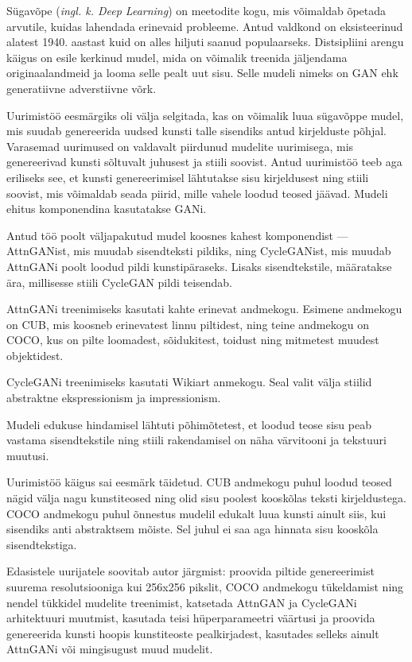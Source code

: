 \documentclass{vilgym}
\newcommand*{\inglk}[1]{(\textit{ingl. k. #1})}
\begin{document}
	
	Sügavõpe \inglk{Deep Learning} on meetodite kogu, mis võimaldab õpetada arvutile, kuidas lahendada erinevaid probleeme. Antud valdkond on eksisteerinud alatest 1940. aastast kuid on alles hiljuti saanud populaarseks. Distsipliini arengu käigus on esile kerkinud mudel, mida on võimalik treenida jäljendama originaalandmeid ja looma selle pealt uut sisu. Selle mudeli nimeks on GAN ehk generatiivne adverstiivne võrk.
	
	Uurimistöö eesmärgiks oli välja selgitada, kas on võimalik luua sügavõppe mudel, mis suudab genereerida uudsed kunsti talle sisendiks antud kirjelduste põhjal. Varasemad uurimused on valdavalt piirdunud mudelite uurimisega, mis genereerivad kunsti sõltuvalt juhusest ja stiili soovist. Antud uurimistöö teeb aga eriliseks see, et kunsti genereerimisel lähtutakse sisu kirjeldusest ning stiili soovist, mis võimaldab seada piirid, mille vahele loodud teosed jäävad. Mudeli ehitus komponendina kasutatakse GANi.
	
	Antud töö poolt väljapakutud mudel koosnes kahest komponendist --- AttnGANist, mis muudab sisendteksti pildiks, ning CycleGANist, mis muudab AttnGANi poolt loodud pildi kunstipäraseks. Lisaks sisendtekstile, määratakse ära, millisesse stiili CycleGAN pildi teisendab.
	
	AttnGANi treenimiseks kasutati kahte erinevat andmekogu. Esimene andmekogu on CUB, mis koosneb erinevatest linnu piltidest, ning teine andmekogu on COCO, kus on pilte loomadest, sõidukitest, toidust ning mitmetest muudest objektidest.
	
	CycleGANi treenimiseks kasutati Wikiart anmekogu. Seal valit välja stiilid abstraktne ekspressionism ja impressionism.
	
	Mudeli edukuse hindamisel lähtuti põhimõtetest, et loodud teose sisu peab vastama sisendtekstile ning stiili rakendamisel on näha värvitooni ja tekstuuri muutusi.
	
	Uurimistöö käigus sai eesmärk täidetud. CUB andmekogu puhul loodud teosed nägid välja nagu kunstiteosed ning olid sisu poolest kooskõlas teksti kirjeldustega. COCO andmekogu puhul õnnestus mudelil edukalt luua kunsti ainult siis, kui sisendiks anti abstraktsem mõiste. Sel juhul ei saa aga hinnata sisu kooskõla sisendtekstiga.
	
	Edasistele uurijatele soovitab autor järgmist: proovida piltide genereerimist suurema resolutsiooniga kui 256x256 pikslit, COCO andmekogu tükeldamist ning nendel tükkidel mudelite treenimist, katsetada AttnGAN ja CycleGANi arhitektuuri muutmist, kasutada teisi hüperparameetri väärtusi ja proovida genereerida kunsti hoopis kunstiteoste pealkirjadest, kasutades selleks ainult AttnGANi või mingisugust muud mudelit.
\end{document}
